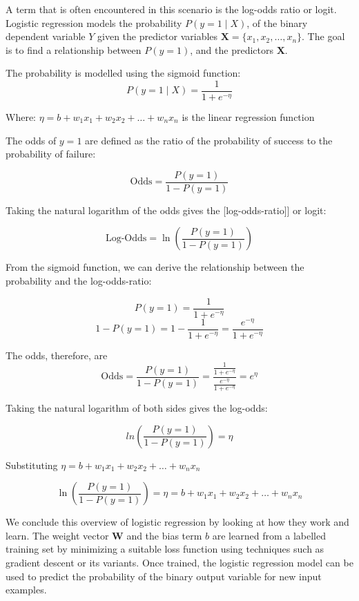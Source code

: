		
		A term that is often encountered in this scenario is the log-odds ratio or logit. Logistic regression models the probability $P(y = 1 \mid X)$, of the binary dependent variable $Y$ given the predictor variables $\textbf{X} = \{x_1, x_2, \dots, x_n\}$. The goal is to find a relationship between $P(y=1)$, and the predictors $\textbf{X}$.
		
		The probability is modelled using the sigmoid function:
		$$P(y = 1 \mid X) = \frac{1}{1 + e^{-\eta}}$$
		
		Where:
		$\eta = b + w_1 x_1 + w_2 x_2 + \dots + w_n x_n$  is the linear regression function
		
		The odds of $y=1$ are defined as the ratio of the probability of success to the probability of failure:
		
		$$\text{Odds} = \frac{P(y = 1)}{1 - P(y = 1)}$$
		
		Taking the natural logarithm of the odds gives the 
		[log-odds-ratio]] or logit:
		
		$$\text{Log-Odds} = \ln\left(\frac{P(y = 1)}{1 - P(y = 1)}\right)$$
		
		From the sigmoid function, we can derive the relationship between the probability and the log-odds-ratio:
		
		$$P(y = 1) = \frac{1}{1 + e^{-\eta}}$$
		$$1 - P(y = 1) = 1 - \frac{1}{1 + e^{-\eta}} = \frac{e^{-\eta}}{1 + e^{-\eta}}$$
		
		The odds, therefore, are
		$$\text{Odds} = \frac{P(y = 1)}{1 - P(y = 1)} = \frac{\frac{1}{1 + e^{-\eta}}}{\frac{e^{-\eta}}{1 + e^{-\eta}}} = e^{\eta}$$
		
		
		Taking the natural logarithm of both sides gives the log-odds:
		
		$$ln\left(\frac{P(y = 1)}{1 - P(y = 1)}\right) = \eta$$
		
		Substituting $\eta = b + w_1 x_1 + w_2 x_2 + \dots + w_n x_n$
		
		\begin{equation}
			\ln\left(\frac{P(y = 1)}{1 - P(y = 1)}\right) = \eta = b + w_1 x_1 + w_2 x_2 + \dots + w_n x_n
		\end{equation}
		
		\bigskip
		
		We conclude this overview of logistic regression by looking at how they work and learn.	The weight vector $\textbf{W}$ and the bias term $b$ are learned from a labelled training set by minimizing a suitable loss function using techniques such as gradient descent or its variants. Once trained, the logistic regression model can be used to predict the probability of the binary output variable for new input examples.
		

